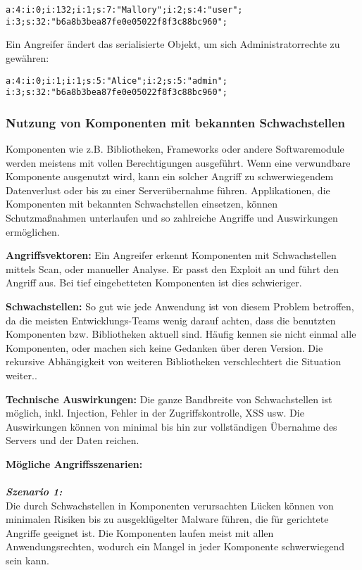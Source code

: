 \texttt{a:4:{i:0;i:132;i:1;s:7:"Mallory";i:2;s:4:"user";\\
		i:3;s:32:"b6a8b3bea87fe0e05022f8f3c88bc960";}}

Ein Angreifer ändert das serialisierte Objekt, um sich Administratorrechte zu gewähren:

\texttt{a:4:{i:0;i:1;i:1;s:5:"Alice";i:2;s:5:"admin";\\
		i:3;s:32:"b6a8b3bea87fe0e05022f8f3c88bc960";}}

\subsubsection{Nutzung von Komponenten mit bekannten Schwachstellen}

Komponenten wie z.B. Bibliotheken, Frameworks oder andere Softwaremodule werden meistens mit
vollen Berechtigungen ausgeführt. Wenn eine verwundbare Komponente ausgenutzt wird, kann ein
solcher Angriff zu schwerwiegendem Datenverlust oder bis zu einer Serverübernahme führen.
Applikationen, die Komponenten mit bekannten Schwachstellen einsetzen, können Schutzmaßnahmen
unterlaufen und so zahlreiche Angriffe und Auswirkungen ermöglichen\cite[6]{owasp17top10}.

\textbf{Angriffsvektoren:} Ein Angreifer
erkennt Komponenten mit Schwachstellen mittels Scan,
oder manueller Analyse. Er passt den Exploit an und
führt den Angriff aus. Bei tief eingebetteten Komponenten ist dies schwieriger\cite[15]{owasp17top10}.

\textbf{Schwachstellen:} So gut wie jede Anwendung ist von diesem Problem betroffen, da die meisten Entwicklungs-Teams wenig darauf achten, dass die benutzten Komponenten bzw. Bibliotheken aktuell sind. Häufig kennen sie nicht einmal alle Komponenten, oder
machen sich keine Gedanken über deren Version.
Die rekursive Abhängigkeit von weiteren Bibliotheken verschlechtert die Situation weiter.\cite[15]{owasp17top10}.

\textbf{Technische Auswirkungen:} Die ganze Bandbreite
von Schwachstellen ist möglich, inkl. Injection, Fehler in der Zugriffskontrolle, XSS usw. Die Auswirkungen
können von minimal bis hin zur vollständigen Übernahme
des Servers und der Daten reichen\cite[15]{owasp17top10}.

\textbf{Mögliche Angriffsszenarien:}\\
\\
\textbf{\textit{Szenario 1:}}\\
Die durch Schwachstellen in Komponenten verursachten
Lücken können von minimalen Risiken bis zu ausgeklügelter Malware führen, die für gerichtete Angriffe geeignet ist. Die Komponenten laufen meist mit allen Anwendungsrechten, wodurch ein Mangel in jeder Komponente schwerwiegend sein kann\cite[15]{owasp17top10}.

